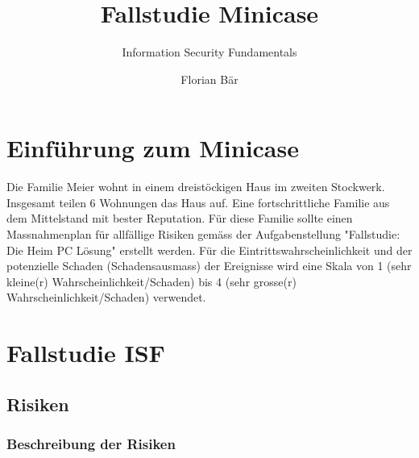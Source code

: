 \documentclass{article}
\author{Florian Bär}
\title{Fallstudie Minicase}
\subtitle{Information Security Fundamentals}
\begin{document}
\tableofcontents
	
\maketitle

\section{Einführung zum Minicase}

Die Familie Meier wohnt in einem dreistöckigen Haus im zweiten Stockwerk. Insgesamt teilen 6 Wohnungen das Haus auf. Eine fortschrittliche Familie aus dem Mittelstand mit bester Reputation. Für diese Familie sollte einen Massnahmenplan für allfällige Risiken gemäss der Aufgabenstellung "Fallstudie: Die Heim PC Lösung" erstellt werden. Für die Eintrittswahrscheinlichkeit und der potenzielle Schaden (Schadensausmass) der Ereignisse wird eine Skala von 1 (sehr kleine(r) Wahrscheinlichkeit/Schaden) bis 4 (sehr grosse(r) Wahrscheinlichkeit/Schaden) verwendet.

\section{Fallstudie ISF}

\subsection{Risiken}

\subsubsection{Beschreibung der Risiken}
\end{document}
